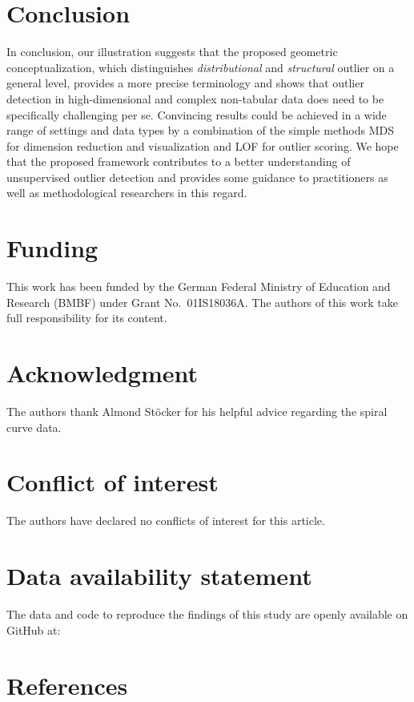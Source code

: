 \documentclass[
  10pt]{article}
\begin{document}
\hypertarget{sec:conclusion}{%
\section{Conclusion}\label{sec:conclusion}}

In conclusion, our illustration suggests that the proposed geometric conceptualization, which distinguishes \emph{distributional} and \emph{structural} outlier on a general level, provides a more precise terminology and shows that outlier detection in high-dimensional and complex non-tabular data does need to be specifically challenging per se. Convincing results could be achieved in a wide range of settings and data types by a combination of the simple methods MDS for dimension reduction and visualization and LOF for outlier scoring. We hope that the proposed framework contributes to a better understanding of unsupervised outlier detection and provides some guidance to practitioners as well as methodological researchers in this regard.

\section*{Funding}

This work has been funded by the German Federal Ministry of Education and Research (BMBF) under Grant No.~01IS18036A. The authors of this work take full responsibility for its content.

\section*{Acknowledgment}

The authors thank Almond Stöcker for his helpful advice regarding the spiral curve data.

\section*{Conflict of interest}

The authors have declared no conflicts of interest for this article.

\section*{Data availability statement}

The data and code to reproduce the findings of this study are openly available on GitHub at:

\section*{References}
\end{document}
